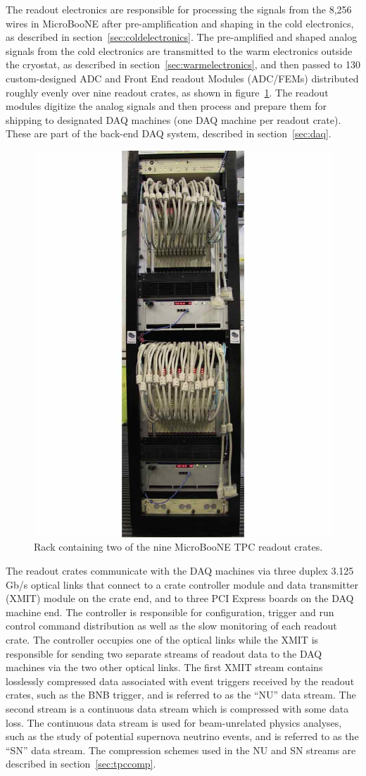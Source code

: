 The \lartpc readout electronics are responsible for processing the signals from the 8,256 wires in MicroBooNE after pre-amplification and shaping in the cold electronics, as described in section~\ref{sec:coldelectronics}.  The pre-amplified and shaped analog signals from the cold electronics are transmitted to the warm electronics outside the cryostat, as described in section~\ref{sec:warmelectronics}, and then passed to 130 custom-designed ADC and Front End readout Modules (ADC/FEMs) distributed roughly evenly over nine readout crates, as shown in figure~\ref{fig:rocrates}.  The readout modules digitize the analog signals and then process and prepare them for shipping to designated DAQ machines (one DAQ machine per readout crate). These are part of the back-end DAQ system, described in section~\ref{sec:daq}. 

\begin{figure}
\begin{center}
\includegraphics[width=0.5\linewidth]{figures/rocrates.jpg}
\end{center}
\caption{\label{fig:rocrates}Rack containing two of the nine MicroBooNE TPC readout crates.}
\end{figure}

The \lartpc readout crates communicate with the DAQ machines via three duplex 3.125 Gb/s optical links that connect to a crate controller module and data transmitter (XMIT) module on the crate end, and to three PCI Express boards on the DAQ machine end. The controller is responsible for configuration, trigger and run control command distribution as well as the slow monitoring of each readout crate. The controller occupies one of the optical links while the XMIT is responsible for sending two separate streams of readout data to the DAQ machines via the two other optical links. The first XMIT stream contains losslessly compressed \lartpc data associated with event triggers received by the \lartpc readout crates, such as the BNB trigger, and is referred to as the ``NU'' data stream. The second stream is a continuous \lartpc data stream which is compressed with some data loss. The continuous data stream is used for beam-unrelated physics analyses, such as the study of potential supernova neutrino events, and is referred to as the ``SN'' data stream. The compression schemes used in the NU and SN streams are described in section~\ref{sec:tpccomp}.

